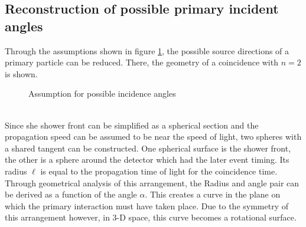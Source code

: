 \documentclass[abstract,toc,los,lof,english,10pt,glossary,acronyms]{jluthesis}
\begin{document}
\subsection{Reconstruction of possible primary incident angles} \label{sec:reconstruction}
Through the assumptions shown in figure \ref{fig:angle-assumptions}, the possible source directions of a primary particle can be reduced. There, the geometry of a coincidence with $n=2$ is shown.
\begin{figure}[ht!]
	\centering
	\caption{Assumption for possible incidence angles}
	\label{fig:angle-assumptions}
\end{figure} \\
Since she shower front can be simplified as a spherical section and the propagation speed can be assumed to be near the speed of light, two spheres with a shared tangent can be constructed. One spherical surface is the shower front, the other is a sphere around the detector which had the later event timing. Its radius $\ell$ is equal to the propagation time of light for the coincidence time. Through geometrical analysis of this arrangement, the Radius and angle pair can be derived as a function of the angle $\alpha$. This creates a curve in the plane on which the primary interaction must have taken place. Due to the symmetry of this arrangement however, in 3-D space, this curve becomes a rotational surface. \\
\end{document}
